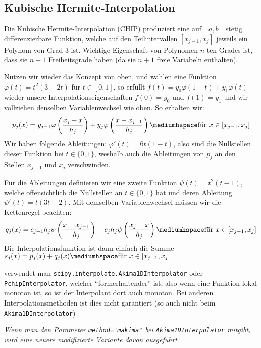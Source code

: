 \subsection{Kubische Hermite-Interpolation}
Die Kubische Hermite-Interpolation (CHIP) produziert eine auf $[a, b]$ stetig differenzierbare Funktion, welche auf den Teilintervallen $[x_{j - 1}, x_j]$ jeweils ein Polynom von Grad 3 ist.
Wichtige Eigenschaft von Polynomen $n$-ten Grades ist, dass sie $n + 1$ Freiheitsgrade haben (da sie $n + 1$ freie Variabeln enthalten).

Nutzen wir wieder das Konzept von oben, und wählen eine Funktion $\varphi(t) = t^2(3 - 2t)$ für $t \in [0, 1]$,
so erfüllt $f(t) = y_0\varphi(1 - t) + y_1 \varphi(t)$ wieder unsere Interpolationseigenschaften $f(0) = y_0$ und $f(1) = y_1$ und wir vollziehen denselben Variablenwechsel wie oben.
So erhalten wir:
\begin{align*}
    p_j(x) = y_{j - 1} \varphi \left( \frac{x_j - x}{h_j} \right) + y_j \varphi \left( \frac{x - x_{j - 1}}{h_j} \right) \mediumhspace \text{für } x \in [x_{j - 1}, x_j]
\end{align*}
Wir haben folgende Ableitungen: $\varphi'(t) = 6t(1 - t)$, also sind die Nullstellen dieser Funktion bei $t \in \{ 0, 1 \}$,
weshalb auch die Ableitungen von $p_j$ an den Stellen $x_{j - 1}$ und $x_j$ verschwinden.

Für die Ableitungen definieren wir eine zweite Funktion $\psi(t) = t^2(t - 1)$, welche offensichtlich die Nullstellen an $t \in \{ 0, 1 \}$ hat
und deren Ableitung $\psi'(t) = t(3t - 2)$. Mit demselben Variablenwechsel müssen wir die Kettenregel beachten:
\begin{align*}
    q_j(x) = c_{j - 1} h_j \psi \left( \frac{x - x_{j - 1}}{h_j} \right) - c_j h_j \psi \left( \frac{x_j - x}{h_j} \right) \mediumhspace \text{für } x \in [x_{j - 1}, x_j]
\end{align*}
Die Interpolationsfunktion ist dann einfach die Summe $s_j(x) = p_j(x) + q_j(x) \mediumhspace \text{für } x \in [x_{j - 1}, x_j]$

\innumpy verwendet man \texttt{scipy.interpolate.Akima1DInterpolator} oder \texttt{PchipInterpolator}, welcher ``formerhaltender'' ist,
also wenn eine Funktion lokal monoton ist, so ist der Interpolant dort auch monoton.
Bei anderen Interpolationsmethoden ist dies nicht garantiert (so auch nicht beim \texttt{Akima1DInterpolator})

\begin{footnotesize}
    \textit{Wenn man den Parameter \texttt{method="makima"} bei \texttt{Akima1DInterpolator} mitgibt, wird eine neuere modifizierte Variante davon ausgeführt}
\end{footnotesize}

